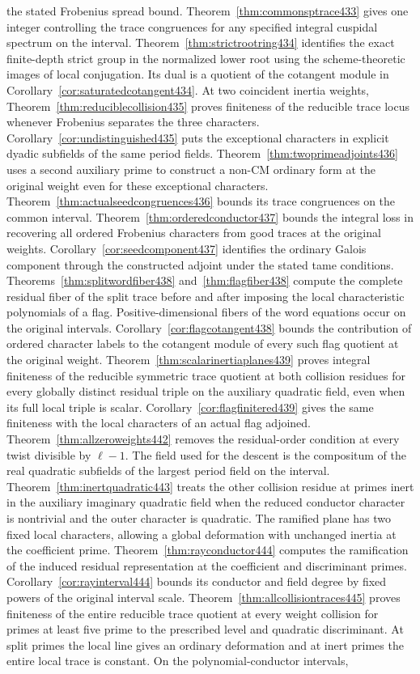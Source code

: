 \documentclass[a4paper,11pt]{article}
\theoremstyle{definition}
\theoremstyle{remark}
\numberwithin{equation}{section}
\begin{document}
the stated Frobenius spread bound. Theorem~\ref{thm:commonsptrace433} gives one integer controlling the trace congruences for any specified integral cuspidal spectrum on the interval. Theorem~\ref{thm:strictrootring434} identifies the exact finite-depth strict group in the normalized lower root using the scheme-theoretic images of local conjugation. Its dual is a quotient of the cotangent module in Corollary~\ref{cor:saturatedcotangent434}. At two coincident inertia weights, Theorem~\ref{thm:reduciblecollision435} proves finiteness of the reducible trace locus whenever Frobenius separates the three characters. Corollary~\ref{cor:undistinguished435} puts the exceptional characters in explicit dyadic subfields of the same period fields. Theorem~\ref{thm:twoprimeadjoints436} uses a second auxiliary prime to construct a non-CM ordinary form at the original weight even for these exceptional characters. Theorem~\ref{thm:actualseedcongruences436} bounds its trace congruences on the common interval. Theorem~\ref{thm:orderedconductor437} bounds the integral loss in recovering all ordered Frobenius characters from good traces at the original weights. Corollary~\ref{cor:seedcomponent437} identifies the ordinary Galois component through the constructed adjoint under the stated tame conditions. Theorems~\ref{thm:splitwordfiber438} and~\ref{thm:flagfiber438} compute the complete residual fiber of the split trace before and after imposing the local characteristic polynomials of a flag. Positive-dimensional fibers of the word equations occur on the original intervals. Corollary~\ref{cor:flagcotangent438} bounds the contribution of ordered character labels to the cotangent module of every such flag quotient at the original weight. Theorem~\ref{thm:scalarinertiaplanes439} proves integral finiteness of the reducible symmetric trace quotient at both collision residues for every globally distinct residual triple on the auxiliary quadratic field, even when its full local triple is scalar. Corollary~\ref{cor:flagfinitered439} gives the same finiteness with the local characters of an actual flag adjoined. Theorem~\ref{thm:allzeroweights442} removes the residual-order condition at every twist divisible by \(\ell-1\). The field used for the descent is the compositum of the real quadratic subfields of the largest period field on the interval. Theorem~\ref{thm:inertquadratic443} treats the other collision residue at primes inert in the auxiliary imaginary quadratic field when the reduced conductor character is nontrivial and the outer character is quadratic. The ramified plane has two fixed local characters, allowing a global deformation with unchanged inertia at the coefficient prime. Theorem~\ref{thm:rayconductor444} computes the ramification of the induced residual representation at the coefficient and discriminant primes. Corollary~\ref{cor:rayinterval444} bounds its conductor and field degree by fixed powers of the original interval scale. Theorem~\ref{thm:allcollisiontraces445} proves finiteness of the entire reducible trace quotient at every weight collision for primes at least five prime to the prescribed level and quadratic discriminant. At split primes the local line gives an ordinary deformation and at inert primes the entire local trace is constant. On the polynomial-conductor intervals, 
\end{document}

